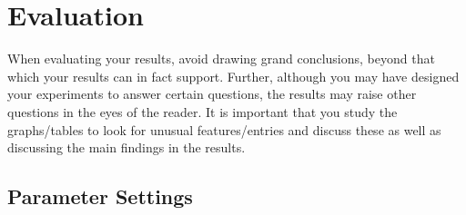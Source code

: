 \section{Evaluation}

When evaluating your results, avoid drawing grand conclusions, beyond that which your results can in fact support. Further, although you may have designed your experiments to answer certain questions, the results may raise other questions in the eyes of the reader. It is important that you study the graphs/tables to look for unusual features/entries and discuss these as well as discussing the main findings in the results. 

\subsection{Parameter Settings}
